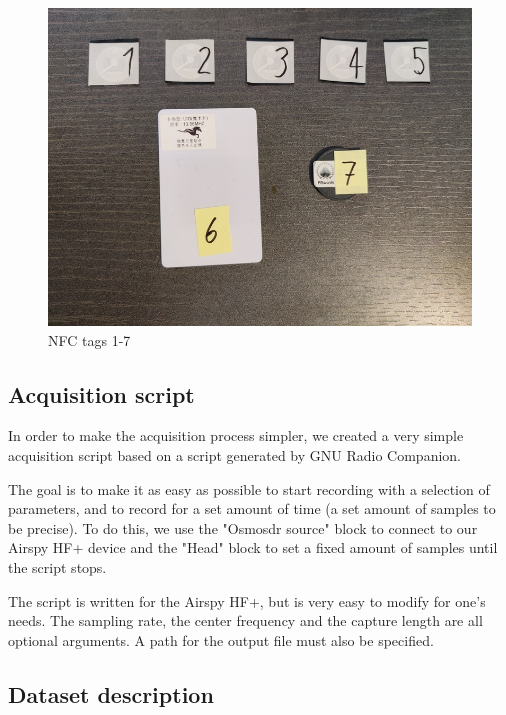 \begin{figure}[htbp!]
  \centering
  \includegraphics[scale=0.35]{figures/data_standard-tags2.jpg}
  \caption{NFC tags 1-7}
  \label{fig:tags}
\end{figure}

\subsection{Acquisition script} \label{script}

In order to make the acquisition process simpler, we created a very simple acquisition script based on a script generated by GNU Radio Companion.

The goal is to make it as easy as possible to start recording with a selection of parameters, and to record for a set amount of time (a set amount of samples to be precise). To do this, we use the "Osmosdr source" block to connect to our Airspy HF+ device and the "Head" block to set a fixed amount of samples until the script stops.

The script is written for the Airspy HF+, but is very easy to modify for one's needs. The sampling rate, the center frequency and the capture length are all optional arguments. A path for the output file must also be specified.

\subsection{Dataset description}

